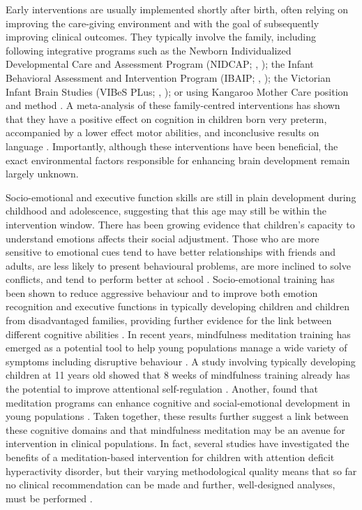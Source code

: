 Early interventions are usually implemented shortly after birth, often relying on improving the care-giving environment and with the goal of subsequently improving clinical outcomes. They typically involve the family, including following integrative programs such as the Newborn Individualized Developmental Care and Assessment Program (NIDCAP; \citeauthor{Peters2009}, \citeyear{Peters2009}); the Infant Behavioral Assessment and Intervention Program (IBAIP; \citeauthor{VanHus2016}, \citeyear{VanHus2016}); the Victorian Infant Brain Studies (VIBeS PLus; \citeauthor{Spittle2018}, \citeyear{Spittle2018}); or using Kangaroo Mother Care position and method \citep{Peters2009}. A meta-analysis of these family-centred interventions has shown that they have a positive effect on cognition in children born very preterm, accompanied by a lower effect motor abilities, and inconclusive results on language \citep{Ferreira2020}. Importantly, although these interventions have been beneficial, the exact environmental factors responsible for enhancing brain development remain largely unknown. 

Socio-emotional and executive function skills are still in plain development during childhood and adolescence, suggesting that this age may still be within the intervention window. There has been growing evidence that children's capacity to understand emotions affects their social adjustment. Those who are more sensitive to emotional cues tend to have better relationships with friends and adults, are less likely to present behavioural problems, are more inclined to solve conflicts, and tend to perform better at school \citep{Denham2006,Domitrovich2007, Harrington2020}. Socio-emotional training has been shown to reduce aggressive behaviour and to improve both emotion recognition and executive functions in typically developing children and children from disadvantaged families, providing further evidence for the link between different cognitive abilities \citep{Pons2002,Sprung2015, Grazzani2018, DeMooij2020}. In recent years, mindfulness meditation training has emerged as a potential tool to help young populations manage a wide variety of symptoms including disruptive behaviour \citep{Perry-Parrish2016}. A study involving typically developing children at 11 years old showed that 8 weeks of mindfulness training already has the potential to improve attentional self-regulation \citep{Felver2017}. Another, found that meditation programs can enhance cognitive and social-emotional development in young populations \citep{Schonert-Reichl2015}. Taken together, these results further suggest a link between these cognitive domains and that mindfulness meditation may be an avenue for intervention in clinical populations. In fact, several studies have investigated the benefits of a meditation-based intervention for children with attention deficit hyperactivity disorder, but their varying methodological quality means that so far no clinical recommendation can be made and further, well-designed analyses, must be performed \citep{Evans2018}.

